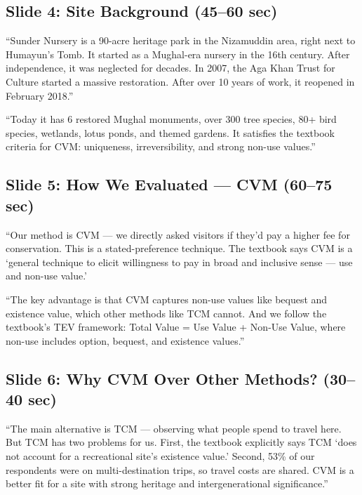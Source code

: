 \documentclass[11pt, a4paper]{article}
\newenvironment{ansbox}{%
    \def\FrameCommand{\textcolor{darkgreen}{\vrule width 2pt}\hspace{8pt}}%
    \MakeFramed{\advance\hsize-\width\FrameRestore}%
}{%
    \endMakeFramed%
}
\begin{document}
\subsection{Slide 4: Site Background \normalfont\small(45--60 sec)}
\begin{ansbox}
``Sunder Nursery is a 90-acre heritage park in the Nizamuddin area, right next to Humayun's Tomb. It started as a Mughal-era nursery in the 16th century. After independence, it was neglected for decades. In 2007, the Aga Khan Trust for Culture started a massive restoration. After over 10 years of work, it reopened in February 2018.''

``Today it has 6 restored Mughal monuments, over 300 tree species, 80+ bird species, wetlands, lotus ponds, and themed gardens. It satisfies the textbook criteria for CVM: uniqueness, irreversibility, and strong non-use values.''
\end{ansbox}

\subsection{Slide 5: How We Evaluated --- CVM \normalfont\small(60--75 sec)}
\begin{ansbox}
``Our method is CVM --- we directly asked visitors if they'd pay a higher fee for conservation. This is a stated-preference technique. The textbook says CVM is a `general technique to elicit willingness to pay in broad and inclusive sense --- use and non-use value.'

``The key advantage is that CVM captures non-use values like bequest and existence value, which other methods like TCM cannot. And we follow the textbook's TEV framework: Total Value = Use Value + Non-Use Value, where non-use includes option, bequest, and existence values.''
\end{ansbox}

\subsection{Slide 6: Why CVM Over Other Methods? \normalfont\small(30--40 sec)}
\begin{ansbox}
``The main alternative is TCM --- observing what people spend to travel here. But TCM has two problems for us. First, the textbook explicitly says TCM `does not account for a recreational site's existence value.' Second, 53\% of our respondents were on multi-destination trips, so travel costs are shared. CVM is a better fit for a site with strong heritage and intergenerational significance.''
\end{ansbox}
\end{document}
